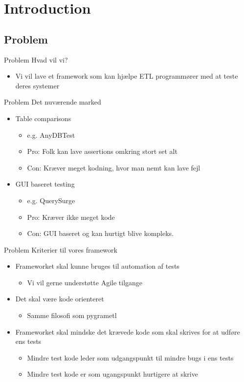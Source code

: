 \section{Introduction}

\subsection{Problem}
\begin{frame}{Problem}{}
  Hvad vil vi?
  \begin{itemize}
  \item Vi vil lave et framework som kan hjælpe ETL programmører med at teste deres systemer
  \end{itemize}
\end{frame}

\begin{frame}{Problem}{}
  Det nuværende marked
  \begin{itemize}
  \item<2-> Table comparisons
    \begin{itemize}
    \item e.g. AnyDBTest
    \item Pro: Folk kan lave assertions omkring stort set alt
    \item Con: Kræver meget kodning, hvor man nemt kan lave fejl
    \end{itemize}
  \item<3-> GUI baseret testing
    \begin{itemize}
    \item e.g. QuerySurge
    \item Pro: Kræver ikke meget kode
    \item Con: GUI baseret og kan hurtigt blive kompleks.
    \end{itemize}
  \end{itemize}
\end{frame}


\begin{frame}{Problem}{}
  Kriterier til vores framework
  \begin{itemize}
  \item<2-> Frameworket skal kunne bruges til automation af tests
    \begin{itemize}
    \item Vi vil gerne understøtte Agile tilgange
    \end{itemize}
  \item<3-> Det skal være kode orienteret
    \begin{itemize}
    \item Samme filosofi som pygrametl
    \end{itemize}
  \item<4-> Frameworket skal mindske det krævede kode som skal skrives for at udføre ens tests
    \begin{itemize}
    \item Mindre test kode leder som udgangspunkt til mindre bugs i ens tests
    \item Mindre test kode er som ugangspunkt hurtigere at skrive
    \end{itemize}
  \end{itemize}
\end{frame}

